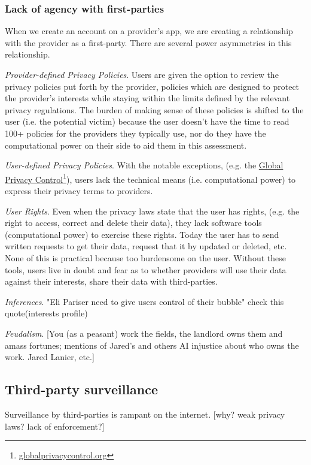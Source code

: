 \documentclass[11pt, oneside]{article}   	%
\newcommand{\hyperfootnote}[1][]{\def\ArgI{{#1}}\hyperfootnoteRelay}
\newcommand\hyperfootnoteRelay[2][]{\href{#1#2}{\ArgI}\footnote{\href{#1#2}{#2}}}
\begin{document}
\subsubsection{Lack of agency with first-parties}

When we create an account on a provider's app, we are creating a relationship with the provider as a first-party. There are several power asymmetries in this relationship.

\emph{Provider-defined Privacy Policies}. Users are given the option to review the privacy policies put forth by the provider, policies which are designed to protect the provider's interests while staying within the limits defined by the relevant privacy regulations. The burden of making sense of these policies is shifted to the user (i.e. the potential victim) because the user doesn't have the time to read 100+ policies for the providers they typically use, nor do they have the computational power on their side to aid them in this assessment. 

\emph{User-defined Privacy Policies}. With the notable exceptions, (e.g. the \hyperfootnote[Global Privacy Control][https://]{globalprivacycontrol.org}), users  lack the technical means (i.e. computational power) to express their privacy terms to providers.

\emph{User Rights}. Even when the privacy laws state that the user has rights, (e.g. the right to access, correct and delete their data), they lack software tools (computational power) to exercise these rights. Today the user has to send written requests to get their data, request that it by updated or deleted, etc. None of this is practical because too burdensome on the user. Without these tools, users live in doubt and fear as to whether providers will use their data against their interests, share their data with third-parties.

\emph{Inferences}. "Eli Pariser need to give users control of their bubble" check this quote\cite[p66]{McNamee2020}(interests profile)

\emph{Feudalism}. [You (as a peasant) work the fields, the landlord owns them and amass fortunes; mentions of Jared's and others AI injustice about who owns the work. Jared Lanier, etc.]

\subsection{Third-party surveillance}

Surveillance by third-parties is rampant on the internet. [why? weak privacy laws? lack of enforcement?]
\end{document}
